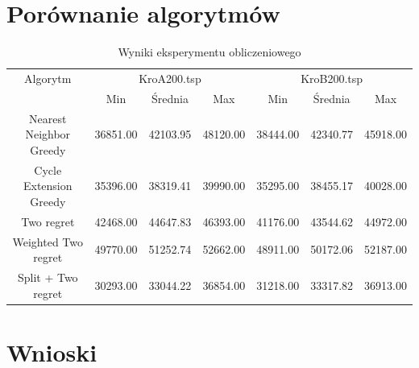 \documentclass[11pt]{article}
\begin{document}
\section{Porównanie algorytmów}\label{sec:porównanie-algorytmów}
\begin{table}[H]
    \centering
    \begin{tabular}{|c||c|c|c||c|c|c|}
        \hline
        Algorytm & \multicolumn{3}{c||}{KroA200.tsp} & \multicolumn{3}{c|}{KroB200.tsp} \\
        \cline{2-4} \cline{5-7}
        & Min & Średnia & Max & Min & Średnia & Max   \\
        \hline
        Nearest Neighbor Greedy & 36851.00 & 42103.95 & 48120.00 & 38444.00 & 42340.77 & 45918.00 \\
        \hline
        Cycle Extension Greedy & 35396.00 & 38319.41 & 39990.00 & 35295.00 & 38455.17 & 40028.00 \\
        \hline
        Two regret & 42468.00 & 44647.83 & 46393.00 & 41176.00 & 43544.62 & 44972.00 \\
        \hline
        Weighted Two regret & 49770.00 & 51252.74 & 52662.00 & 48911.00 & 50172.06 & 52187.00 \\
        \hline
        Split + Two regret & 30293.00 & 33044.22 & 36854.00 & 31218.00 & 33317.82 & 36913.00 \\
        \hline
    \end{tabular}
    \caption{Wyniki eksperymentu obliczeniowego}
    \label{tab:wyniki-eksperymentu}
\end{table}

\section{Wnioski}\label{sec:wnioski}
\end{document}
